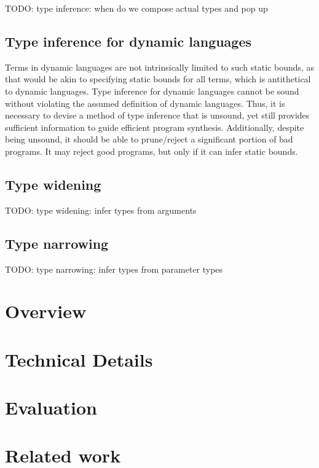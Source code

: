 \documentclass[]{acmart}
\begin{document}
TODO: type inference: when do we compose actual types and pop up

\subsection*{Type inference for dynamic languages}
Terms in dynamic languages are not intrinsically limited to such static bounds, as that would be akin
to specifying static bounds for all terms, which is antithetical to dynamic languages. 
Type inference for dynamic languages cannot be sound without violating 
the assumed definition of dynamic languages. 
Thus, it is necessary to devise a method of type inference that is unsound, yet still provides   
sufficient information to guide efficient program synthesis.
Additionally, despite being unsound, it should be able to prune/reject 
a significant portion of bad programs. 
It may reject good programs, but only if it can infer static bounds.

\subsection*{Type widening}
TODO: type widening: infer types from arguments

\subsection*{Type narrowing}
TODO: type narrowing: infer types from parameter types




\section{Overview}

\section{Technical Details}

\section{Evaluation}

\section{Related work}





\end{document}
